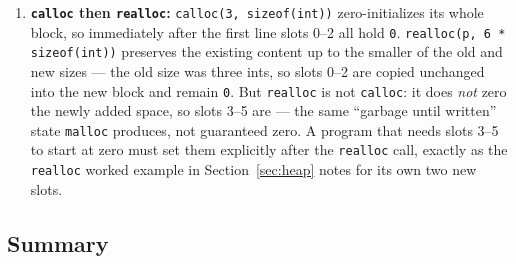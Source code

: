 \documentclass[11pt]{article}
\begin{document}
\begin{enumerate}
    two-integer block to the heap's free space. A subsequent \texttt{malloc} of
    three integers will be served from \emph{available} free space; the exact
    address is the allocator's choice and not something the program may rely on.
    What you \emph{can} say is general: the allocator reuses freed space, so the
    heap's used region can shrink and later regrow --- the important invariant
    is that each block is reached only through a live pointer, never through a
    guess about its neighbour.
  \item \textbf{\texttt{calloc} then \texttt{realloc}:} \texttt{calloc(3, sizeof(int))}
    zero-initializes its whole block, so immediately after the first line
    slots 0--2 all hold \texttt{0}. \texttt{realloc(p, 6 * sizeof(int))}
    preserves the existing content up to the smaller of the old and new sizes
    --- the old size was three ints, so slots 0--2 are copied unchanged into
    the new block and remain \texttt{0}. But \texttt{realloc} is not
    \texttt{calloc}: it does \emph{not} zero the newly added space, so slots
    3--5 are  --- the same ``garbage until written'' state
    \texttt{malloc} produces, not guaranteed zero. A program that needs slots
    3--5 to start at zero must set them explicitly after the \texttt{realloc}
    call, exactly as the \texttt{realloc} worked example in
    Section~\ref{sec:heap} notes for its own two new slots.
\end{enumerate}
\endgroup

\subsection*{Summary}
\end{document}
